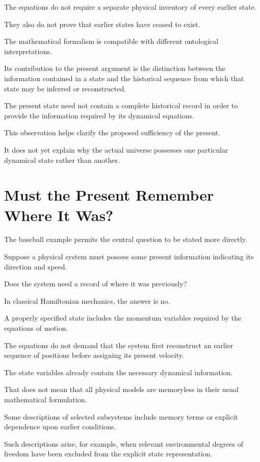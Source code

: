 \documentclass[12pt,onecolumn]{article}
\begin{document}
The equations do not require a separate physical inventory of every earlier state.

They also do not prove that earlier states have ceased to exist.

The mathematical formalism is compatible with different ontological interpretations.

Its contribution to the present argument is the distinction between the information contained in a state and the historical sequence from which that state may be inferred or reconstructed.

The present state need not contain a complete historical record in order to provide the information required by its dynamical equations.

This observation helps clarify the proposed sufficiency of the present.

It does not yet explain why the actual universe possesses one particular dynamical state rather than another.


\section{Must the Present Remember Where It Was?}

The baseball example permits the central question to be stated more directly.

Suppose a physical system must possess some present information indicating its direction and speed.

Does the system need a record of where it was previously?

In classical Hamiltonian mechanics, the answer is no.

A properly specified state includes the momentum variables required by the equations of motion.

The equations do not demand that the system first reconstruct an earlier sequence of positions before assigning its present velocity.

The state variables already contain the necessary dynamical information.

That does not mean that all physical models are memoryless in their usual mathematical formulation.

Some descriptions of selected subsystems include memory terms or explicit dependence upon earlier conditions.

Such descriptions arise, for example, when relevant environmental degrees of freedom have been excluded from the explicit state representation.
\end{document}
